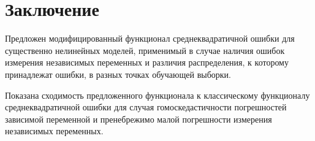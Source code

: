 \documentclass[tikz,11pt,a4paper]{article}
\begin{document}
\section{Заключение}

Предложен модифицированный функционал среднеквадратичной ошибки для существенно
нелинейных моделей, применимый в случае наличия ошибок измерения независимых
переменных и различия распределения, к которому принадлежат ошибки, в разных
точках обучающей выборки.

Показана сходимость предложенного функционала к классическому функционалу
среднеквадратичной ошибки для случая гомоскедастичности погрешностей
зависимой переменной и пренебрежимо малой погрешности измерения независимых
переменных.

\FloatBarrier


%
%

\end{document}
